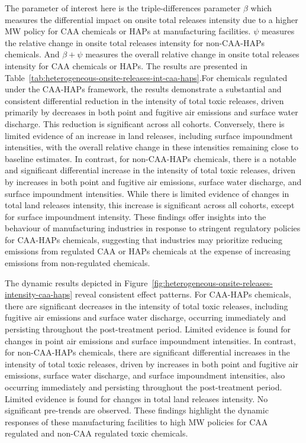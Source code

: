 \documentclass[12pt, english]{article}
\begin{document}
    The parameter of interest here is the triple-differences parameter $\beta$ which measures the differential impact on onsite total releases intensity due to a higher MW policy for CAA chemicals or HAPs at manufacturing facilities. $\psi$ measures the relative change in onsite total releases intensity for non-CAA-HAPs chemicals. And $\beta + \psi$ measures the overall relative change in onsite total releases intensity for CAA chemicals or HAPs. The results are presented in Table~\ref{tab:heterogeneous-onsite-releases-int-caa-haps}.For chemicals regulated under the CAA-HAPs framework, the results demonstrate a substantial and consistent differential reduction in the intensity of total toxic releases, driven primarily by decreases in both point and fugitive air emissions and surface water discharge. This reduction is significant across all cohorts. Conversely, there is limited evidence of an increase in land releases, including surface impoundment intensities, with the overall relative change in these intensities remaining close to baseline estimates. In contrast, for non-CAA-HAPs chemicals, there is a notable and significant differential increase in the intensity of total toxic releases, driven by increases in both point and fugitive air emissions, surface water discharge, and surface impoundment intensities. While there is limited evidence of changes in total land releases intensity, this increase is significant across all cohorts, except for surface impoundment intensity. These findings offer insights into the behaviour of manufacturing industries in response to stringent regulatory policies for CAA-HAPs chemicals, suggesting that industries may prioritize reducing emissions from regulated CAA or HAPs chemicals at the expense of increasing emissions from non-regulated chemicals.
    
    The dynamic results depicted in Figure~\ref{fig:heterogeneous-onsite-releases-intensity-caa-haps} reveal consistent effect patterns. For CAA-HAPs chemicals, there are significant decreases in the intensity of total toxic releases, including fugitive air emissions and surface water discharge, occurring immediately and persisting throughout the post-treatment period. Limited evidence is found for changes in point air emissions and surface impoundment intensities. In contrast, for non-CAA-HAPs chemicals, there are significant differential increases in the intensity of total toxic releases, driven by increases in both point and fugitive air emissions, surface water discharge, and surface impoundment intensities, also occurring immediately and persisting throughout the post-treatment period. Limited evidence is found for changes in total land releases intensity. No significant pre-trends are observed. These findings highlight the dynamic responses of these manufacturing facilities to high MW policies for CAA regulated and non-CAA regulated toxic chemicals.
\end{document}
